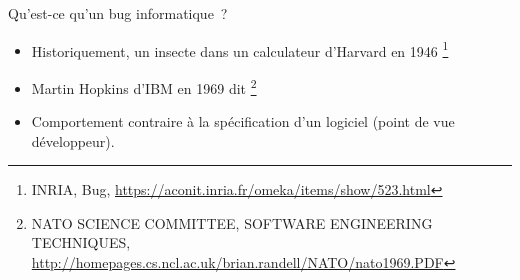 \documentclass{beamer}
\begin{document}
    \begin{frame}{Qu'est-ce qu'un bug informatique~?}
        \begin{itemize}

            \item Historiquement, un insecte dans un calculateur d'Harvard en 1946 \footnote{INRIA, Bug, \url{https://aconit.inria.fr/omeka/items/show/523.html}}
            \item Martin Hopkins d'IBM en 1969 dit \footnote{NATO SCIENCE COMMITTEE, SOFTWARE ENGINEERING TECHNIQUES, \url{http://homepages.cs.ncl.ac.uk/brian.randell/NATO/nato1969.PDF}}
            \item Comportement contraire à la spécification d'un logiciel (point de vue développeur).
        \end{itemize}
    \end{frame}
\end{document}
